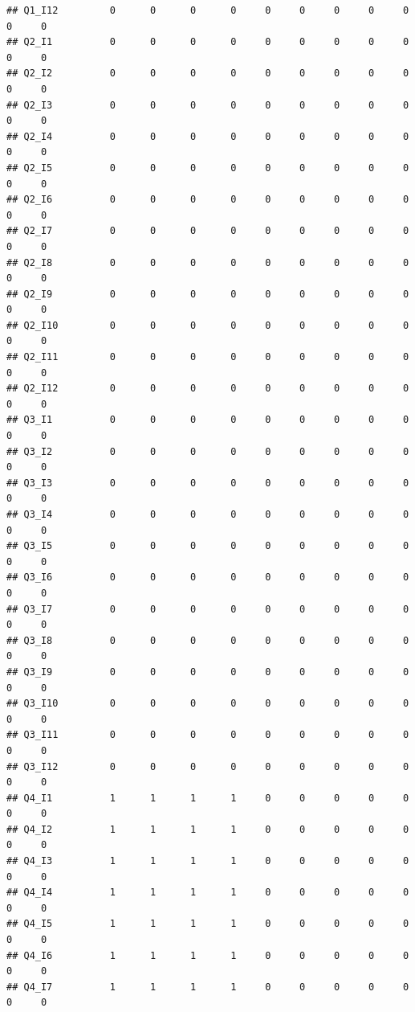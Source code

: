\documentclass[
]{book}
\begin{document}
\begin{verbatim}
## Q1_I12         0      0      0      0     0     0     0     0     0     0     0
## Q2_I1          0      0      0      0     0     0     0     0     0     0     0
## Q2_I2          0      0      0      0     0     0     0     0     0     0     0
## Q2_I3          0      0      0      0     0     0     0     0     0     0     0
## Q2_I4          0      0      0      0     0     0     0     0     0     0     0
## Q2_I5          0      0      0      0     0     0     0     0     0     0     0
## Q2_I6          0      0      0      0     0     0     0     0     0     0     0
## Q2_I7          0      0      0      0     0     0     0     0     0     0     0
## Q2_I8          0      0      0      0     0     0     0     0     0     0     0
## Q2_I9          0      0      0      0     0     0     0     0     0     0     0
## Q2_I10         0      0      0      0     0     0     0     0     0     0     0
## Q2_I11         0      0      0      0     0     0     0     0     0     0     0
## Q2_I12         0      0      0      0     0     0     0     0     0     0     0
## Q3_I1          0      0      0      0     0     0     0     0     0     0     0
## Q3_I2          0      0      0      0     0     0     0     0     0     0     0
## Q3_I3          0      0      0      0     0     0     0     0     0     0     0
## Q3_I4          0      0      0      0     0     0     0     0     0     0     0
## Q3_I5          0      0      0      0     0     0     0     0     0     0     0
## Q3_I6          0      0      0      0     0     0     0     0     0     0     0
## Q3_I7          0      0      0      0     0     0     0     0     0     0     0
## Q3_I8          0      0      0      0     0     0     0     0     0     0     0
## Q3_I9          0      0      0      0     0     0     0     0     0     0     0
## Q3_I10         0      0      0      0     0     0     0     0     0     0     0
## Q3_I11         0      0      0      0     0     0     0     0     0     0     0
## Q3_I12         0      0      0      0     0     0     0     0     0     0     0
## Q4_I1          1      1      1      1     0     0     0     0     0     0     0
## Q4_I2          1      1      1      1     0     0     0     0     0     0     0
## Q4_I3          1      1      1      1     0     0     0     0     0     0     0
## Q4_I4          1      1      1      1     0     0     0     0     0     0     0
## Q4_I5          1      1      1      1     0     0     0     0     0     0     0
## Q4_I6          1      1      1      1     0     0     0     0     0     0     0
## Q4_I7          1      1      1      1     0     0     0     0     0     0     0

\end{verbatim}
\end{document}

